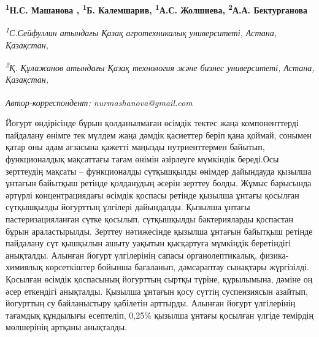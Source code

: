 
\begin{articleheader}

{\bfseries
\textsuperscript{1}Н.С. Машанова\textsuperscript{\envelope } ,
\textsuperscript{1}Б. Калемшарив,
\textsuperscript{1}А.С. Жолшиева,
\textsuperscript{2}А.А. Бектурганова}
\end{articleheader}

\begin{affiliation}
\emph{\textsuperscript{1}С.Сейфуллин атындағы Қазақ агротехникалық университеті, Астана, Қазақстан,}

\emph{\textsuperscript{2}Қ. Құлажанов атындағы Қазақ технология және бизнес университеті, Астана, Қазақстан,}

\raggedright \textsuperscript{\envelope }{\em Автор-корреспондент: nurmashanova@gmail.com}
\end{affiliation}

Йогурт өндірісінде бұрын қолданылмаған өсімдік тектес жаңа
компоненттерді пайдалану өнімге тек мүлдем жаңа дәмдік қасиеттер беріп
қана қоймай, сонымен қатар оны адам ағзасына қажетті маңызды
нутриенттермен байытып, функционалдық мақсаттағы тағам өнімін әзірлеуге
мүмкіндік береді.Осы зерттеудің мақсаты -- функционалды сүтқышқылды
өнімдер дайындауда қызылша ұнтағын байытқыш ретінде қолданудың әсерін
зерттеу болды. Жұмыс барысында әртүрлі концентрациядағы өсімдік қоспасы
ретінде қызылша ұнтағы қосылған сүтқышқылды йогурттың үлгілері
дайындалды. Қызылша ұнтағы пастеризацияланған сүтке қосылып, сүтқышқылды
бактерияларды қоспастан бұрын араластырылды. Зерттеу нәтижесінде қызылша
ұнтағын байытқыш ретінде пайдалану сүт қышқылын ашыту уақытын қысқартуға
мүмкіндік беретіндігі анықталды. Алынған йогурт үлгілерінің сапасы
органолептикалық, физика-химиялық көрсеткіштер бойынша бағаланып,
дәмсараптау сынақтары жүргізілді. Қосылған өсімдік қоспасының йогурттың
сыртқы түріне, құрылымына, дәміне оң әсер еткендігі анықталды. Қызылша
ұнтағын қосу сүттің суспензиясын азайтып, йогурттың су байланыстыру
қабілетін арттырды. Алынған йогурт үлгілерінің тағамдық құндылығы
есептеліп, 0,25\% қызылша ұнтағы қосылған үлгіде темірдің мөлшерінің
артқаны анықталды.

